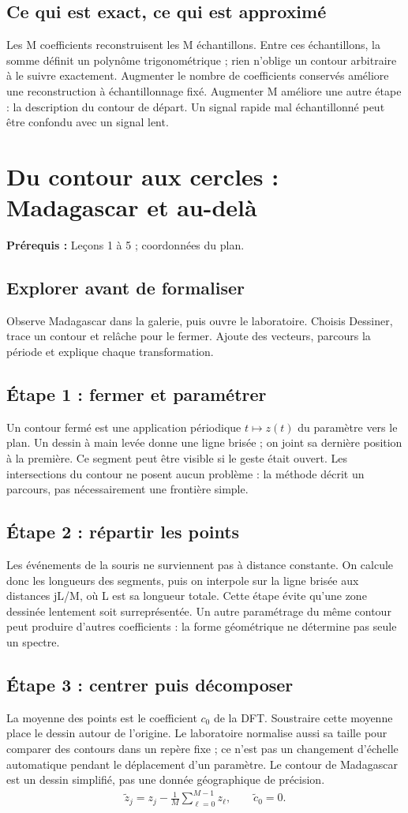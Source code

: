 \documentclass[11pt,a4paper]{article}
\begin{document}
\subsection{Ce qui est exact, ce qui est approximé}
Les M coefficients reconstruisent les M échantillons. Entre ces échantillons, la somme définit un polynôme trigonométrique ; rien n’oblige un contour arbitraire à le suivre exactement. Augmenter le nombre de coefficients conservés améliore une reconstruction à échantillonnage fixé. Augmenter M améliore une autre étape : la description du contour de départ. Un signal rapide mal échantillonné peut être confondu avec un signal lent.
\clearpage
\section{Du contour aux cercles : Madagascar et au-delà}
\textbf{Prérequis :} Leçons 1 à 5 ; coordonnées du plan.
\subsection*{Explorer avant de formaliser}Observe Madagascar dans la galerie, puis ouvre le laboratoire. Choisis Dessiner, trace un contour et relâche pour le fermer. Ajoute des vecteurs, parcours la période et explique chaque transformation.
\subsection{Étape 1 : fermer et paramétrer}
Un contour fermé est une application périodique $t\mapsto z(t)$ du paramètre vers le plan. Un dessin à main levée donne une ligne brisée ; on joint sa dernière position à la première. Ce segment peut être visible si le geste était ouvert. Les intersections du contour ne posent aucun problème : la méthode décrit un parcours, pas nécessairement une frontière simple.
\subsection{Étape 2 : répartir les points}
Les événements de la souris ne surviennent pas à distance constante. On calcule donc les longueurs des segments, puis on interpole sur la ligne brisée aux distances jL/M, où L est sa longueur totale. Cette étape évite qu’une zone dessinée lentement soit surreprésentée. Un autre paramétrage du même contour peut produire d’autres coefficients : la forme géométrique ne détermine pas seule un spectre.
\subsection{Étape 3 : centrer puis décomposer}
La moyenne des points est le coefficient $c_0$ de la DFT. Soustraire cette moyenne place le dessin autour de l’origine. Le laboratoire normalise aussi sa taille pour comparer des contours dans un repère fixe ; ce n’est pas un changement d’échelle automatique pendant le déplacement d’un paramètre. Le contour de Madagascar est un dessin simplifié, pas une donnée géographique de précision.
\[\begin{gathered}\widetilde z_j=z_j-\frac1M\sum_{\ell=0}^{M-1}z_\ell,\qquad \widetilde c_0=0.\end{gathered}\]
\end{document}
